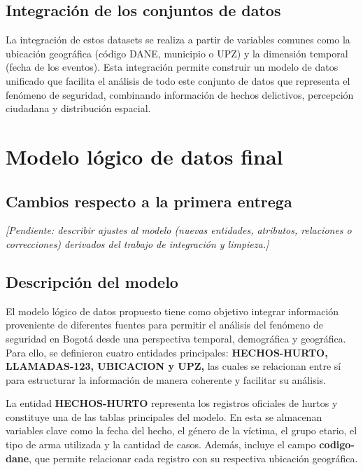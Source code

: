 \documentclass[12pt,letterpaper]{article}
\begin{document}
\subsection{Integración de los conjuntos de datos}

La integración de estos datasets se realiza a partir de variables comunes como la ubicación geográfica (código DANE, municipio o UPZ) y la dimensión temporal (fecha de los eventos). Esta integración permite construir un modelo de datos unificado que facilita el análisis de todo este conjunto de datos que representa el fenómeno de seguridad, combinando información de hechos delictivos, percepción ciudadana y distribución espacial.

\section{Modelo lógico de datos final}

\subsection{Cambios respecto a la primera entrega}

\textit{[Pendiente: describir ajustes al modelo (nuevas entidades, atributos, relaciones o correcciones) derivados del trabajo de integración y limpieza.]}

\subsection{Descripción del modelo}

El modelo lógico de datos propuesto tiene como objetivo integrar información proveniente de diferentes fuentes para permitir el análisis del fenómeno de seguridad en Bogotá desde una perspectiva temporal, demográfica y geográfica. Para ello, se definieron cuatro entidades principales: \textbf{HECHOS-HURTO, LLAMADAS-123, UBICACION y UPZ,} las cuales se relacionan entre sí para estructurar la información de manera coherente y facilitar su análisis.

La entidad \textbf{HECHOS-HURTO} representa los registros oficiales de hurtos y constituye una de las tablas principales del modelo. En esta se almacenan variables clave como la fecha del hecho, el género de la víctima, el grupo etario, el tipo de arma utilizada y la cantidad de casos. Además, incluye el campo \textbf{codigo-dane}, que permite relacionar cada registro con su respectiva ubicación geográfica.
\end{document}
